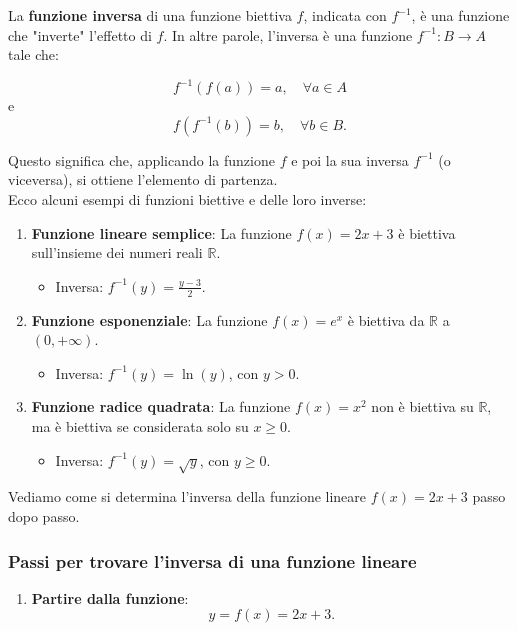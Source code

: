 \documentclass[article,12pt]{book}
\begin{document}
\begin{enumerate}
{La \textbf{funzione inversa} di una funzione biettiva \( f \), indicata con \( f^{-1} \), è una funzione che "inverte" l'effetto di \( f \). In altre parole, l'inversa è una funzione \( f^{-1}: B \rightarrow A \) tale che:

\[
f^{-1}(f(a)) = a, \quad \forall a \in A
\]
e
\[
f(f^{-1}(b)) = b, \quad \forall b \in B.
\]

Questo significa che, applicando la funzione \( f \) e poi la sua inversa \( f^{-1} \) (o viceversa), si ottiene l'elemento di partenza. \\
Ecco alcuni esempi di funzioni biettive e delle loro inverse:

\begin{enumerate}
    \item \textbf{Funzione lineare semplice}: La funzione \( f(x) = 2x + 3 \) è biettiva sull'insieme dei numeri reali \( \mathbb{R} \).
    \begin{itemize}
        \item Inversa: \( f^{-1}(y) = \frac{y - 3}{2} \).
    \end{itemize}
    
    \item \textbf{Funzione esponenziale}: La funzione \( f(x) = e^x \) è biettiva da \( \mathbb{R} \) a \( (0, +\infty) \).
    \begin{itemize}
        \item Inversa: \( f^{-1}(y) = \ln(y) \), con \( y > 0 \).
    \end{itemize}
    
    \item \textbf{Funzione radice quadrata}: La funzione \( f(x) = x^2 \) non è biettiva su \( \mathbb{R} \), ma è biettiva se considerata solo su \( x \geq 0 \).
    \begin{itemize}
        \item Inversa: \( f^{-1}(y) = \sqrt{y} \), con \( y \geq 0 \).
    \end{itemize}
\end{enumerate}

Vediamo come si determina l'inversa della funzione lineare \( f(x) = 2x + 3 \) passo dopo passo.

\subsubsection{Passi per trovare l'inversa di una funzione lineare}

\begin{enumerate}
    \item \textbf{Partire dalla funzione}: 
    \[
    y = f(x) = 2x + 3.
    \]


\end{enumerate}}
\end{enumerate}
\end{document}
